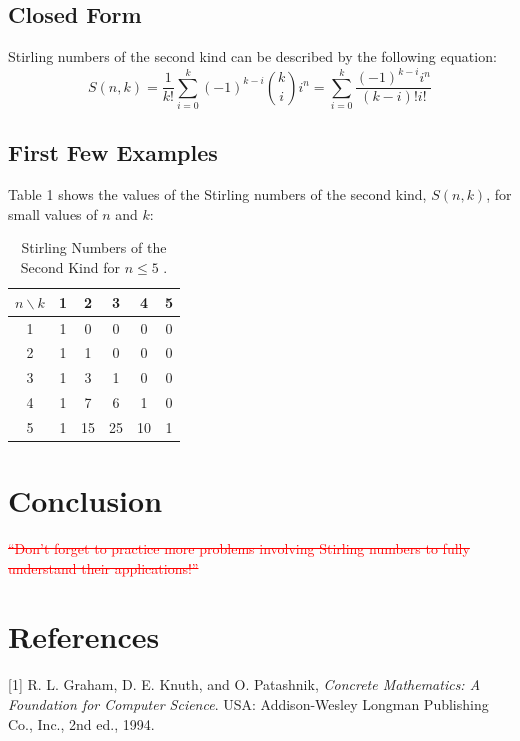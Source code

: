 \documentclass{article}
\begin{document}
    \subsection{Closed Form}
    Stirling numbers of the second kind can be described by the following equation: \\

    \begin{equation}
    S(n, k) = \frac{1}{k!}\sum_{i=0}^{k}(-1)^{k-i}\binom{k}{i}i^{n}=\sum_{i=0}^{k}\frac{(-1)^{k-i}i^{n}}{(k-i)!i!}
\end{equation}





    \subsection{First Few Examples}
     Table 1 shows the values of the Stirling numbers of the second kind, $S(n,k)$,
 for small values of $n$ and $k$:

 
\begin{table}[h]
    \centering
    
    \begin{tabular}{|c|c|c|c|c|c|}
        \hline
        \( n \backslash k \) & 1 & 2 & 3 & 4 & 5 \\
        \hline
        1 & 1 & 0 & 0 & 0 & 0 \\
        2 & 1 & 1 & 0 & 0 & 0 \\
        3 & 1 & 3 & 1 & 0 & 0 \\
        4 & 1 & 7 & 6 & 1 & 0 \\
        5 & 1 & 15 & 25 & 10 & 1 \\
        \hline
    \end{tabular}
    \caption{Stirling Numbers of the Second Kind for $n \leq 5$
.}
\end{table}

\section{Conclusion}
\textcolor{red}{\sout{“Don’t forget to practice more problems involving Stirling numbers to fully understand their applications!”}}
\section*{References}
[1] R. L. Graham, D. E. Knuth, and O. Patashnik, \textit{Concrete Mathematics: A Foundation for Computer Science}. USA: Addison-Wesley Longman Publishing Co., Inc., 2nd ed., 1994.


\vspace{2cm} %
\end{document}

